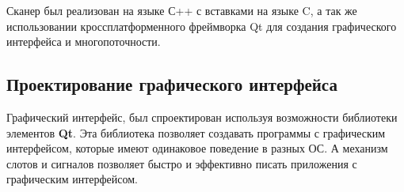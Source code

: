 Сканер был реализован на языке С++ с вставками на языке C, а так же
использовании кроссплатформенного фреймворка Qt для создания
графического интерфейса и многопоточности.

\hypertarget{ux43fux440ux43eux435ux43aux442ux438ux440ux43eux432ux430ux43dux438ux435-ux433ux440ux430ux444ux438ux447ux435ux441ux43aux43eux433ux43e-ux438ux43dux442ux435ux440ux444ux435ux439ux441ux430}{%
\subsection{Проектирование графического
интерфейса}\label{ux43fux440ux43eux435ux43aux442ux438ux440ux43eux432ux430ux43dux438ux435-ux433ux440ux430ux444ux438ux447ux435ux441ux43aux43eux433ux43e-ux438ux43dux442ux435ux440ux444ux435ux439ux441ux430}}

Графический интерфейс, был спроектирован используя возможности
библиотеки элементов \textbf{Qt}. Эта библиотека позволяет создавать
программы с графическим интерфейсом, которые имеют одинаковое поведение
в разных ОС. А механизм слотов и сигналов позволяет быстро и эффективно
писать приложения с графическим интерфейсом.
